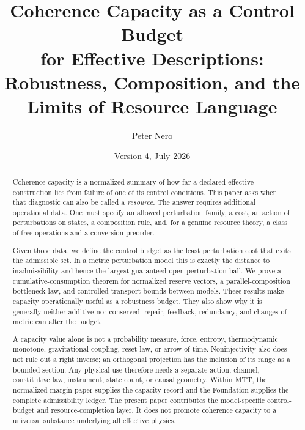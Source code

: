 \documentclass[11pt]{article}
\title{\vspace{-1em}
Coherence Capacity as a Control Budget\\
for Effective Descriptions:\\[0.25em]
\large Robustness, Composition, and the Limits of Resource Language}
\author{Peter Nero}
\date{Version 4, July 2026}
\theoremstyle{definition}
\theoremstyle{remark}
\begin{document}
\maketitle

\begin{abstract}
Coherence capacity is a normalized summary of how far a declared effective
construction lies from failure of one of its control conditions.  This paper
asks when that diagnostic can also be called a \emph{resource}.  The answer
requires additional operational data.  One must specify an allowed
perturbation family, a cost, an action of perturbations on states, a
composition rule, and, for a genuine resource theory, a class of free
operations and a conversion preorder.

Given those data, we define the control budget as the least perturbation
cost that exits the admissible set.  In a metric perturbation model this is
exactly the distance to inadmissibility and hence the largest guaranteed
open perturbation ball.  We prove a cumulative-consumption theorem for
normalized reserve vectors, a parallel-composition bottleneck law, and
controlled transport bounds between models.  These results make capacity
operationally useful as a robustness budget.  They also show why it is
generally neither additive nor conserved: repair, feedback, redundancy, and
changes of metric can alter the budget.

A capacity value alone is not a probability measure, force, entropy,
thermodynamic monotone, gravitational coupling, reset law, or arrow of time.
Noninjectivity also does not rule out a right inverse; an orthogonal
projection has the inclusion of its range as a bounded section.  Any
physical use therefore needs a separate action, channel, constitutive law,
instrument, state count, or causal geometry.  Within MTT, the normalized
margin paper supplies the capacity record and the Foundation supplies the
complete admissibility ledger.  The present paper contributes the
model-specific control-budget and resource-completion layer.  It does not
promote coherence capacity to a universal substance underlying all
effective physics.
\end{abstract}
\end{document}

